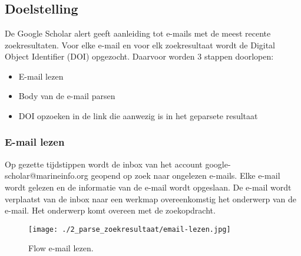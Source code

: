 
\chapter{}%
\label{ch:parsezoekresultaat}

\section{Doelstelling}
De Google Scholar alert geeft aanleiding tot e-mails met de meest recente zoekresultaten. Voor elke e-mail en voor elk zoekresultaat wordt de Digital Object Identifier (DOI) opgezocht. Daarvoor worden 3 stappen doorlopen:
\begin{itemize}
    \item E-mail lezen
    \item Body van de e-mail parsen
    \item DOI opzoeken in de link die aanwezig is in het geparsete resultaat
\end{itemize}
\subsection{E-mail lezen}
Op gezette tijdstippen wordt de inbox van het account google-scholar@marineinfo.org geopend op zoek naar ongelezen e-mails. Elke e-mail wordt gelezen en de informatie van de e-mail wordt opgeslaan. De e-mail wordt verplaatst van de inbox naar een werkmap overeenkomstig het onderwerp van de e-mail. Het onderwerp komt overeen met de zoekopdracht.
\begin{figure}
    \centering
    \texttt{[image: ./2\_parse\_zoekresultaat/email-lezen.jpg]}
    \caption[E-mail lezen.]{\label{fig:E-mail lezen}Flow e-mail lezen.}
\end{figure}
\FloatBarrier

